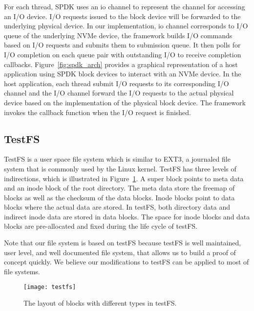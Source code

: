 For each thread, SPDK uses an io channel to represent the channel for accessing an 
I/O device. I/O requests issued to the block device will be forwarded to the underlying
physical device. In our implementation, io channel corresponds to I/O queue 
of the underlying NVMe device, the framework builds I/O commands based on I/O 
requests and submits them to submission queue. It then polls for I/O completion
on each queue pair with outstanding I/O to receive completion callbacks.  
Figure~\ref{fig:spdk_arch} provides a graphical
representation of a host application using SPDK block devices to interact with
an NVMe device. In the host application, each thread submit I/O requests to its
corresponding I/O channel and the I/O channel forward the I/O requests to the 
actual physical device based on the implementation of the physical block device.
The framework invokes the callback function when the I/O request is finished.

\subsection{TestFS}

TestFS\cite{testfs} is a user space file system which is similar to EXT3, a
journaled file system that is commonly used by the Linux kernel. TestFS
has three levels of indirections, which is illustrated in Figure~\ref{fig:testfs}.
A super block points to meta data and an inode block of the root directory. 
The meta data store the freemap of blocks as well as the checksum of the data blocks.
Inode blocks point to data blocks where the actual data are stored. In testFS, both 
directory data and indirect inode data are stored in data blocks. The
space for inode blocks and data blocks are pre-allocated and fixed during the
life cycle of testFS.

Note that our file system is based on testFS because testFS is well maintained, user
level, and well documented file system, that allows us to build a proof of concept
quickly. We believe our modifications to testFS can be applied to most of file systems.

\begin{figure}[h!]
  \centering
  \texttt{[image: testfs]}
  \caption{The layout of blocks with different types in testFS.}
  \label{fig:testfs}
\end{figure}
